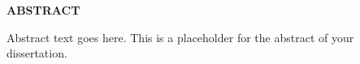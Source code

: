\begin{center}
	\Huge\uppercase{\textbf{Abstract}}
\end{center}

{
\setlength{\baselineskip}{25pt}

Abstract text goes here. This is a placeholder for the abstract of your dissertation.

}
\clearpage
